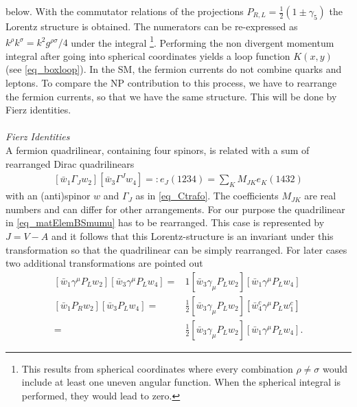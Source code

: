 below. With the commutator relations of the projections
$P_{R,L}=\frac12(1\pm\gamma_5)$ the Lorentz structure is obtained. The numerators can be re-expressed as $k^\rho k^\sigma = k^2g^{\rho\sigma}/4$
under the integral \footnote[1]{This results from spherical coordinates where
every combination $\rho\neq\sigma$ would include at least one uneven angular function. When the spherical integral is performed, they would lead to zero.}.
Performing the non divergent momentum integral after going into spherical coordinates yields a loop function $K(x,y)$ (see \eqref{eq_boxloop}).
In the SM, the fermion currents do not combine quarks and leptons. To compare the NP contribution to this process, we have to rearrange the fermion currents,
so that we have the same structure. This will be done by Fierz identities.
\\ \\ \noindent \textit{Fierz Identities}\\
 A fermion quadrilinear, containing four spinors, is related with a sum of rearranged Dirac quadrilinears \cite{Fierz}
\begin{align}
  \left[\bar w_1\Gamma_J^{} w_2\right] \left[\bar w_3 \Gamma^J w_4 \right] =: e_J(1234) = \sum\limits_K M_{JK} e_K(1432)
\end{align}
with an (anti)spinor $w$ and $\Gamma_J$ as in \eqref{eq_Ctrafo}. The coefficients $M_{JK}$ are real numbers and can differ for other arrangements.
For our purpose the quadrilinear in \eqref{eq_matElemBSmumu} has to be rearranged. This case is represented by $J=V-A$ and it follows that this
Lorentz-structure is an invariant under this transformation so that the quadrilinear can be simply rearranged. For later cases two additional
transformations are pointed out 
\begin{subequations}
\begin{align}
 \left[\bar w_1 \gamma^\mu P_L w_2\right]\left[\bar w_3 \gamma^\mu P_L w_4\right] =& 1  \left[\bar w_3 \gamma_\mu P_L w_2\right]\left[\bar w_1 \gamma^\mu P_L w_4\right]\\
 \left[\bar w_1 P_R w_2\right]\left[\bar w_3 P_L w_4\right] =& \frac12  \left[\bar w_3 \gamma_\mu P_L w_2\right]\left[\bar w^c_4 \gamma^\mu P_L w_1^c\right]\\
 =& \frac12  \left[\bar w_3 \gamma_\mu P_L w_2\right]\left[\bar w_1 \gamma^\mu P_L w_4\right].
 \label{eq_fierzSPtoVA}
\end{align} 
\end{subequations}
